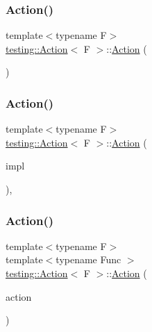 \subsubsection{\texorpdfstring{Action()}{Action()}\hspace{0.1cm}{\footnotesize\ttfamily [9/12]}}
{\footnotesize\ttfamily template$<$typename F$>$ \\
\mbox{\hyperlink{classtesting_1_1_action}{testing\+::\+Action}}$<$ F $>$\+::\mbox{\hyperlink{classtesting_1_1_action}{Action}} (\begin{DoxyParamCaption}{ }\end{DoxyParamCaption})\hspace{0.3cm}{\ttfamily [inline]}}

\mbox{\label{classtesting_1_1_action_a5ce44c673e3f91378777b954d88917cd}} 
\subsubsection{\texorpdfstring{Action()}{Action()}\hspace{0.1cm}{\footnotesize\ttfamily [10/12]}}
{\footnotesize\ttfamily template$<$typename F$>$ \\
\mbox{\hyperlink{classtesting_1_1_action}{testing\+::\+Action}}$<$ F $>$\+::\mbox{\hyperlink{classtesting_1_1_action}{Action}} (\begin{DoxyParamCaption}\item[{\mbox{\hyperlink{classtesting_1_1_action_interface}{Action\+Interface}}$<$ F $>$ $\ast$}]{impl }\end{DoxyParamCaption})\hspace{0.3cm}{\ttfamily [inline]}, {\ttfamily [explicit]}}

\mbox{\label{classtesting_1_1_action_a806bacddaa1f1daf61f89674564bdf0f}} 
\subsubsection{\texorpdfstring{Action()}{Action()}\hspace{0.1cm}{\footnotesize\ttfamily [11/12]}}
{\footnotesize\ttfamily template$<$typename F$>$ \\
template$<$typename Func $>$ \\
\mbox{\hyperlink{classtesting_1_1_action}{testing\+::\+Action}}$<$ F $>$\+::\mbox{\hyperlink{classtesting_1_1_action}{Action}} (\begin{DoxyParamCaption}\item[{const \mbox{\hyperlink{classtesting_1_1_action}{Action}}$<$ Func $>$ \&}]{action }\end{DoxyParamCaption})\hspace{0.3cm}{\ttfamily [explicit]}}

